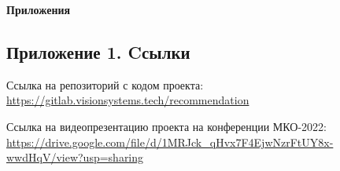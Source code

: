 \documentclass[14pt]{mmcs_article}
\begin{document}
\newpage
{}

\begin{center}
	 {\textbf{\Large Приложения}}
\end{center}
	
\renewcommand{\thesection}{\arabic{section}}
\renewcommand{\thesubsection}{\arabic{subsection}}

\subsection*{Приложение 1. Cсылки}
Ссылка на репозиторий с кодом проекта: \\ \url{https://gitlab.visionsystems.tech/recommendation}

Ссылка на видеопрезентацию проекта на конференции МКО-2022: \\
\url{https://drive.google.com/file/d/1MRJck_qHvx7F4EjwNzrFtUY8x-wwdHqV/view?usp=sharing}
\end{document}
